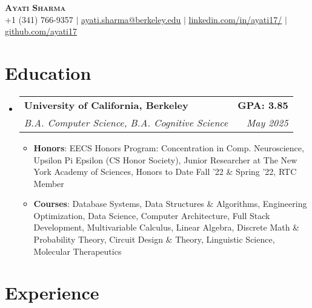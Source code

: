 \documentclass[letterpaper,11pt]{article}
\makeatletter
\newcommand{\resumeItemBF}[2]{
  \item\small{
    \textbf{#1}{: #2 \vspace{-4pt}}
  }
}
\newcommand{\resumeSubheading}[4]{
  \vspace{-2pt}\item
    \begin{tabular*}{0.97\textwidth}[t]{l@{\extracolsep{\fill}}r}
      \textbf{#1} & #2 \\
      \textit{\small#3} & \textit{\small #4} \\
    \end{tabular*}\vspace{-8pt}
}
\newcommand{\resumeSubHeadingListStart}{\begin{itemize}[leftmargin=0.05in, label={}]}
\newcommand{\resumeSubHeadingListEnd}{\end{itemize}}
\newcommand{\resumeItemListStart}{\begin{itemize}[leftmargin=0.2in]}
\newcommand{\resumeItemListEnd}{\end{itemize}\vspace{-5pt}}
\makeatother
\begin{document}
\begin{center}
    \textbf{\Huge \scshape Ayati Sharma} \\ \vspace{1pt}
    \small +1 (341) 766-9357 $|$ \href{mailto:ayati.sharma@berkeley.edu}{\underline{ayati.sharma@berkeley.edu}} $|$
    \href{https://www.linkedin.com/in/ayati17/}{\underline{linkedin.com/in/ayati17/}} $|$
    \href{https://github.com/ayati17/}{\underline{github.com/ayati17}}
    

\end{center}
\vspace{-15pt}


\section{Education}

\resumeSubHeadingListStart
    \resumeSubheading
        {University of California, Berkeley}{\textbf{GPA: 3.85}}
        {B.A. Computer Science, B.A. Cognitive Science}{May 2025}
        
        
        \resumeItemListStart
            \resumeItemBF{Honors}{EECS Honors Program: Concentration in Comp. Neuroscience, Upsilon Pi Epsilon (CS Honor Society), Junior Researcher at The New York Academy of Sciences, Honors to Date Fall '22 \&  Spring '22, RTC Member}
            \resumeItemBF{Courses}{Database Systems, Data Structures \& Algorithms, Engineering Optimization, Data Science, Computer Architecture, Full Stack Development,  Multivariable Calculus, Linear Algebra, Discrete Math \& Probability Theory, Circuit Design \& Theory, Linguistic Science, Molecular Therapeutics}
            
        \resumeItemListEnd
\resumeSubHeadingListEnd


\section{Experience}
\end{document}
